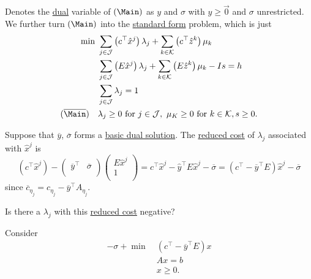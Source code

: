 Denotes the \hyperref[def:dual]{dual} variable of \((\Main)\) as \(y\) and \(\sigma\) with \(y\geq \vec{0}\) and \(\sigma\) unrestricted. We further turn \((\Main)\) into the \hyperref[def:standard-form]{standard form} problem, which is just
\[
	\begin{aligned}
		\min~                   & \sum\limits_{j\in\mathcal{J}}\left(c^{\top}\hat{x}^j\right)\lambda_{j} + \sum\limits_{k\in\mathcal{K}}\left(c^{\top} \hat{z}^k  \right)\mu_k \\
		                        & \sum\limits_{j\in\mathcal{J}}\left(E\hat{x}^j\right)\lambda_{j} + \sum\limits_{k\in\mathcal{K}}\left(E \hat{z}^k \right)\mu_k - Is = h       \\
		                        & \sum\limits_{j\in\mathcal{J}}\lambda_{j} = 1                                                                                                 \\
		(\overline{\Main})\quad & \lambda_{j}\geq 0 \text{ for }j\in\mathcal{J},\ \mu_K\geq 0 \text{ for }k\in\mathcal{K}, s\geq 0.
	\end{aligned}
\]

Suppose that \(\overline{y}\), \(\overline{\sigma}\) forms a \hyperref[def:dual-basic-solution]{basic dual solution}. The \hyperref[def:reduced-cost]{reduced cost}
of \(\lambda_{j}\) associated with \(\hat{x}^j\) is
\[
	(c^{\top}\hat{x}^j) - \begin{pmatrix}
		\overline{y}^{\top} & \overline{\sigma} \\
	\end{pmatrix}\begin{pmatrix}
		E\hat{x}^j \\
		1          \\
	\end{pmatrix} = c^{\top}\hat{x}^j - \hat{y}^{\top}E\hat{x}^j - \overline{\sigma} = (c^{\top} - \overline{y}^{\top}E)\hat{x}^j - \overline{\sigma}
\]
since \(\overline{c}_{\eta_{j}} = c_{\eta_{j}} - \overline{y}^{\top}A_{\eta_{j}}\).

\begin{problem}
Is there a \(\lambda_{j}\) with this \hyperref[def:reduced-cost]{reduced cost} negative?
\end{problem}
\begin{answer}
	Consider
	\[
		\begin{aligned}
			-\sigma + \min~ & (c^{\top} - \overline{y}^{\top}E)x \\
			                & Ax = b                             \\
			                & x\geq 0.
		\end{aligned}
	\]
\end{answer}

